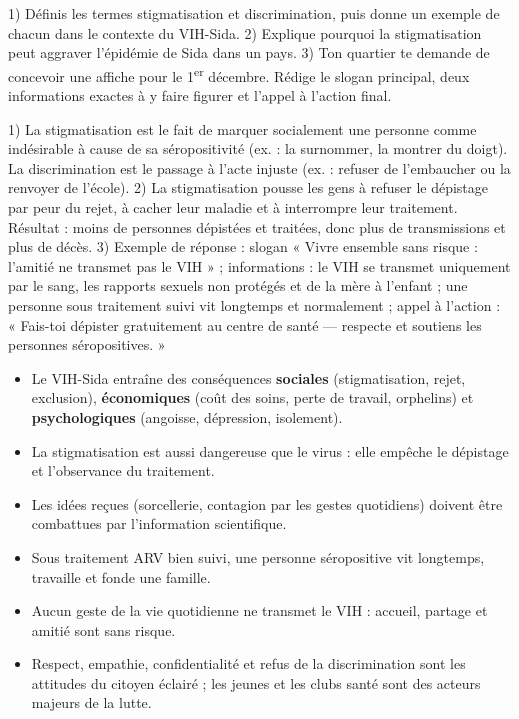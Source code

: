 \documentclass[11pt]{article}
\newcommand{\cle}[1]{{\popxbold\color{popdark}#1}}
\begin{document}
\begin{exercice}
1) Définis les termes \cle{stigmatisation} et \cle{discrimination}, puis donne un exemple de chacun dans le contexte du VIH-Sida.
2) Explique pourquoi la stigmatisation peut aggraver l'épidémie de Sida dans un pays.
3) Ton quartier te demande de concevoir une affiche pour le 1\textsuperscript{er} décembre. Rédige le slogan principal, deux informations exactes à y faire figurer et l'appel à l'action final.
\end{exercice}

\begin{corrige}[Exercice]
1) La stigmatisation est le fait de marquer socialement une personne comme indésirable à cause de sa séropositivité (ex. : la surnommer, la montrer du doigt). La discrimination est le passage à l'acte injuste (ex. : refuser de l'embaucher ou la renvoyer de l'école).
2) La stigmatisation pousse les gens à refuser le dépistage par peur du rejet, à cacher leur maladie et à interrompre leur traitement. Résultat : moins de personnes dépistées et traitées, donc plus de transmissions et plus de décès.
3) Exemple de réponse : slogan « Vivre ensemble sans risque : l'amitié ne transmet pas le VIH » ; informations : le VIH se transmet uniquement par le sang, les rapports sexuels non protégés et de la mère à l'enfant ; une personne sous traitement suivi vit longtemps et normalement ; appel à l'action : « Fais-toi dépister gratuitement au centre de santé — respecte et soutiens les personnes séropositives. »
\end{corrige}

\begin{aretenir}
\begin{itemize}
\item Le VIH-Sida entraîne des conséquences \textbf{sociales} (stigmatisation, rejet, exclusion), \textbf{économiques} (coût des soins, perte de travail, orphelins) et \textbf{psychologiques} (angoisse, dépression, isolement).
\item La stigmatisation est aussi dangereuse que le virus : elle empêche le dépistage et l'observance du traitement.
\item Les idées reçues (sorcellerie, contagion par les gestes quotidiens) doivent être combattues par l'information scientifique.
\item Sous traitement ARV bien suivi, une personne séropositive vit longtemps, travaille et fonde une famille.
\item Aucun geste de la vie quotidienne ne transmet le VIH : accueil, partage et amitié sont sans risque.
\item Respect, empathie, confidentialité et refus de la discrimination sont les attitudes du citoyen éclairé ; les jeunes et les clubs santé sont des acteurs majeurs de la lutte.
\end{itemize}
\end{aretenir}
\end{document}
